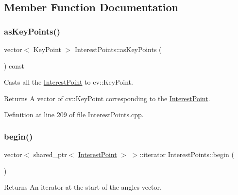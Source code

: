 \subsection{Member Function Documentation}
\mbox{\label{classdefals_1_1_interest_points_ab9144ecca0091fb9acc1cdd075ef8252}} 
\subsubsection{\texorpdfstring{as\+Key\+Points()}{asKeyPoints()}}
{\footnotesize\ttfamily vector$<$ Key\+Point $>$ Interest\+Points\+::as\+Key\+Points (\begin{DoxyParamCaption}{ }\end{DoxyParamCaption}) const}

Casts all the \hyperlink{classdefals_1_1_interest_point}{Interest\+Point} to cv\+::\+Key\+Point.

\begin{DoxyReturn}{Returns}
A vector of cv\+::\+Key\+Point corresponding to the \hyperlink{classdefals_1_1_interest_point}{Interest\+Point}. 
\end{DoxyReturn}


Definition at line 209 of file Interest\+Points.\+cpp.

\mbox{\label{classdefals_1_1_interest_points_a4cf4e695c2abb34a11e3599a21761c21}} 
\subsubsection{\texorpdfstring{begin()}{begin()}\hspace{0.1cm}{\footnotesize\ttfamily [1/2]}}
{\footnotesize\ttfamily vector$<$ shared\+\_\+ptr$<$ \hyperlink{classdefals_1_1_interest_point}{Interest\+Point} $>$ $>$\+::iterator Interest\+Points\+::begin (\begin{DoxyParamCaption}{ }\end{DoxyParamCaption})}

\begin{DoxyReturn}{Returns}
An iterator at the start of the angles vector. 
\end{DoxyReturn}


